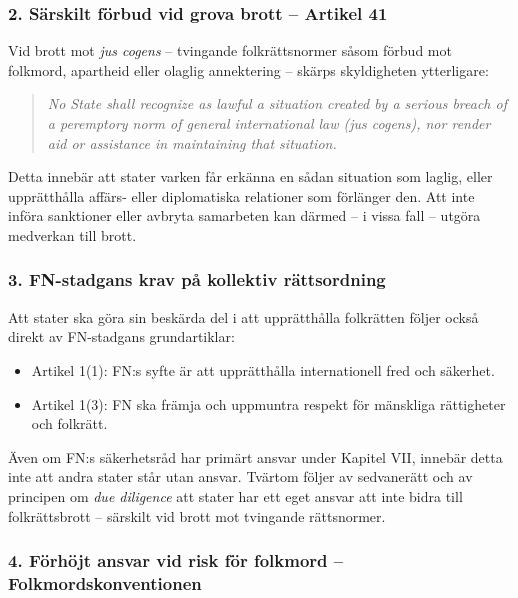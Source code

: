 \subsubsection*{ 2. Särskilt förbud vid grova brott – Artikel 41}

Vid brott mot \textit{jus cogens} – tvingande folkrättsnormer såsom förbud mot folkmord, 
apartheid eller olaglig annektering – skärps skyldigheten ytterligare:

\begin{quote}
\textit{No State shall recognize as lawful a situation created by a serious breach of a peremptory norm of general international law (jus cogens), nor render aid or assistance in maintaining that situation.}
\end{quote}

Detta innebär att stater varken får erkänna en sådan situation som laglig, eller 
upprätthålla affärs- eller diplomatiska relationer som förlänger den. 
Att inte införa sanktioner eller avbryta samarbeten kan därmed – i vissa fall – utgöra medverkan till brott.

\subsubsection*{ 3. FN-stadgans krav på kollektiv rättsordning}

Att stater ska göra sin beskärda del i att upprätthålla folkrätten följer också direkt av FN-stadgans grundartiklar:

\begin{itemize}
  \item Artikel 1(1): FN:s syfte är att upprätthålla internationell fred och säkerhet.
  \item Artikel 1(3): FN ska främja och uppmuntra respekt för mänskliga rättigheter och folkrätt.
\end{itemize}

Även om FN:s säkerhetsråd har primärt ansvar under Kapitel VII, innebär detta inte att 
andra stater står utan ansvar. Tvärtom följer av sedvanerätt och av principen 
om \textit{due diligence} att stater har ett eget ansvar att inte bidra till 
folkrättsbrott – särskilt vid brott mot tvingande rättsnormer.%

\subsubsection*{ 4. Förhöjt ansvar vid risk för folkmord – Folkmordskonventionen}

